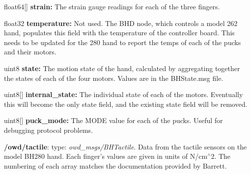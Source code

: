 \begin{DoxyItemize}
\begin{DoxyItemize}
\item float64\mbox{[}\mbox{]} {\bfseries strain\-:} The strain gauge readings for each of the three fingers.
\item float32 {\bfseries temperature\-:} Not used. The B\-H\-D node, which controls a model 262 hand, populates this field with the temperature of the controller board. This needs to be updated for the 280 hand to report the temps of each of the pucks and their motors.
\item uint8 {\bfseries state\-:} The motion state of the hand, calculated by aggregating together the states of each of the four motors. Values are in the B\-H\-State.\-msg file.
\item uint8\mbox{[}\mbox{]} {\bfseries internal\-\_\-state\-:} The individual state of each of the motors. Eventually this will become the only state field, and the existing state field will be removed.
\item uint8\mbox{[}\mbox{]} {\bfseries puck\-\_\-mode\-:} The M\-O\-D\-E value for each of the pucks. Useful for debugging protocol problems.
\end{DoxyItemize}
\item {\bfseries /owd/tactile}\-: type\-: {\itshape owd\-\_\-msgs/\-B\-H\-Tactile}. Data from the tactile sensors on the model B\-H280 hand. Each finger's values are given in units of N/cm$^\wedge$2. The numbering of each array matches the documentation provided by Barrett. 
\end{DoxyItemize}